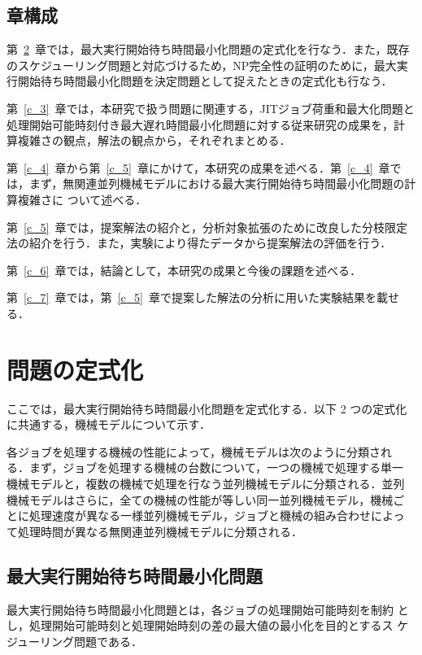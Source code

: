 \documentclass[12pt]{optlab-bachelor}
\begin{document}
\section{章構成}
第~\ref{c_2}~章では，最大実行開始待ち時間最小化問題の定式化を行なう．また，既存のスケジューリング問題と対応づけるため，NP完全性の証明のために，最大実行開始待ち時間最小化問題を決定問題として捉えたときの定式化も行なう．

第~\ref{c_3}~章では，本研究で扱う問題に関連する，JITジョブ荷重和最大化問題と
処理開始可能時刻付き最大遅れ時間最小化問題に対する従来研究の成果を，計
算複雑さの観点，解法の観点から，それぞれまとめる．

第~\ref{c_4}~章から第~\ref{c_5}~章にかけて，本研究の成果を述べる．第~\ref{c_4}~章では，まず，無関連並列機械モデルにおける最大実行開始待ち時間最小化問題の計算複雑さに
ついて述べる．

第~\ref{c_5}~章では，提案解法の紹介と，分析対象拡張のために改良した分枝限定法の紹介を行う．また，実験により得たデータから提案解法の評価を行う．

第~\ref{c_6}~章では，結論として，本研究の成果と今後の課題を述べる．

第~\ref{c_7}~章では，第~\ref{c_5}~章で提案した解法の分析に用いた実験結果を載せる．

\chapter{問題の定式化}\label{c_2}
ここでは，最大実行開始待ち時間最小化問題を定式化する．以下 2 つの定式化に共通する，機械モデルについて示す．

各ジョブを処理する機械の性能によって，機械モデルは次のように分類され
る．まず，ジョブを処理する機械の台数について，一つの機械で処理する単一
機械モデルと，複数の機械で処理を行なう並列機械モデルに分類される．並列
機械モデルはさらに，全ての機械の性能が等しい同一並列機械モデル，機械ご
とに処理速度が異なる一様並列機械モデル，ジョブと機械の組み合わせによっ
て処理時間が異なる無関連並列機械モデルに分類される．

\section{最大実行開始待ち時間最小化問題}
最大実行開始待ち時間最小化問題とは，各ジョブの処理開始可能時刻を制約
とし，処理開始可能時刻と処理開始時刻の差の最大値の最小化を目的とするス
ケジューリング問題である．
\end{document}
